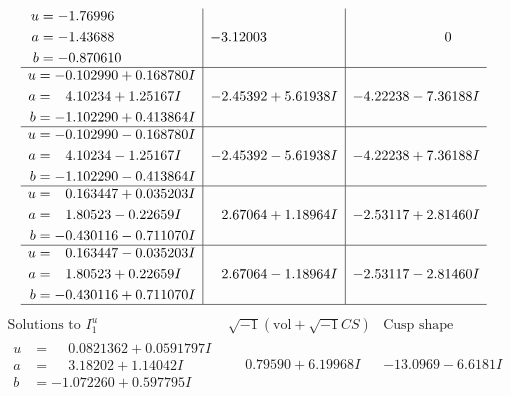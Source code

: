 \documentclass[1p]{elsarticle_modified}
\theoremstyle{definition}
\newcommand{\I}{\sqrt{-1}}
\begin{document}
$$\begin{array}{c|c|c}
\begin{aligned}
u &= -1.76996\phantom{ +0.000000I} \\
a &= -1.43688\phantom{ +0.000000I} \\
b &= -0.870610\phantom{ +0.000000I}\end{aligned}
 & -3.12003\phantom{ +0.000000I} & \phantom{-0.000000 } 0 \\ \hline\begin{aligned}
u &= -0.102990 + 0.168780 I \\
a &= \phantom{-}4.10234 + 1.25167 I \\
b &= -1.102290 + 0.413864 I\end{aligned}
 & -2.45392 + 5.61938 I & -4.22238 - 7.36188 I \\ \hline\begin{aligned}
u &= -0.102990 - 0.168780 I \\
a &= \phantom{-}4.10234 - 1.25167 I \\
b &= -1.102290 - 0.413864 I\end{aligned}
 & -2.45392 - 5.61938 I & -4.22238 + 7.36188 I \\ \hline\begin{aligned}
u &= \phantom{-}0.163447 + 0.035203 I \\
a &= \phantom{-}1.80523 - 0.22659 I \\
b &= -0.430116 - 0.711070 I\end{aligned}
 & \phantom{-}2.67064 + 1.18964 I & -2.53117 + 2.81460 I \\ \hline\begin{aligned}
u &= \phantom{-}0.163447 - 0.035203 I \\
a &= \phantom{-}1.80523 + 0.22659 I \\
b &= -0.430116 + 0.711070 I\end{aligned}
 & \phantom{-}2.67064 - 1.18964 I & -2.53117 - 2.81460 I\\
 \hline 
 \end{array}$$\newpage$$\begin{array}{c|c|c}  
\text{Solutions to }I^u_{1}& \I (\text{vol} + \sqrt{-1}CS) & \text{Cusp shape}\\
 \hline 
\begin{aligned}
u &= \phantom{-}0.0821362 + 0.0591797 I \\
a &= \phantom{-}3.18202 + 1.14042 I \\
b &= -1.072260 + 0.597795 I\end{aligned}
 & \phantom{-}0.79590 + 6.19968 I & -13.0969 - 6.6181 I \\ \hline\begin{aligned}

\end{aligned}
\end{array}$$
\end{document}
